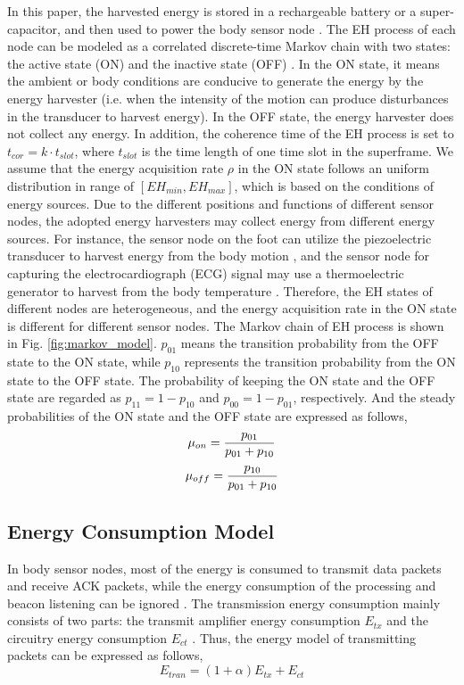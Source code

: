 \documentclass[journal,10pt]{IEEEtran}
\begin{document}
In this paper, the harvested energy is stored in a rechargeable battery or a super-capacitor, and then used to power the body sensor node \cite{akhtar2017energy}. 
The EH process of each node can be modeled as a correlated discrete-time Markov chain with two states: the active state (ON) and the inactive state (OFF) \cite{seyedi2010energy,ibarra2016qos}.
In the ON state, it means the ambient or body conditions are conducive to generate the energy by the energy harvester (i.e. when the intensity of the motion can produce disturbances in the transducer to harvest energy). In the OFF state, the energy harvester does not collect any energy. 
In addition, the coherence time of the EH process is set to $t_{cor}=k \cdot  t_{slot}$, where $t_{slot}$ is the time length of one time slot in the superframe. We assume that the energy acquisition rate $\rho $ in the ON state follows an uniform distribution in range of $[EH_{min}, EH_{max}]$, which is based on the conditions of energy sources. 
Due to the different positions and functions of different sensor nodes, the adopted energy harvesters may collect energy from different energy sources. 
For instance, the sensor node on the foot can utilize the piezoelectric transducer to harvest energy from the body motion \cite{geisler2017human}, and the sensor node for capturing the electrocardiograph (ECG) signal may use a thermoelectric generator to harvest from the body temperature \cite{thielen2017human}. Therefore, the EH states of different nodes are heterogeneous, and the energy acquisition rate in the ON state is different for different sensor nodes.
The Markov chain of EH process is shown in Fig. \ref{fig:markov_model}. $p_{01}$ means the transition probability from the OFF state to the ON state, while $p_{10}$ represents the transition probability from the ON state to the OFF state. The probability of keeping the ON state and the OFF state are regarded as $p_{11}=1-p_{10}$ and $p_{00}=1-p_{01}$, respectively. And the steady probabilities of the ON state and the OFF state are expressed as follows, 
\begin{equation}
{\mu _{on}} = {{{p_{01}}} \over {{p_{01}} + {p_{10}}}}
\end{equation}
\begin{equation}
{\mu _{off}} = {{{p_{10}}} \over {{p_{01}} + {p_{10}}}}
\end{equation}

\subsection{Energy Consumption Model}
In body sensor nodes, most of the energy is consumed to transmit data packets and receive ACK packets, while the energy consumption of the processing and beacon listening can be ignored \cite{xiao2009transmission}. The transmission energy consumption mainly consists of two parts: the transmit amplifier energy consumption $E_{tx}$ and the circuitry energy consumption $E_{ct}$ \cite{he2011optimal,liu2017buffer}. Thus, the energy model of transmitting packets can be expressed as follows,
\begin{equation}
E_{tran} = \left( {1 + \alpha } \right){E_{tx}} + {E_{ct}}
\end{equation}
\end{document}
